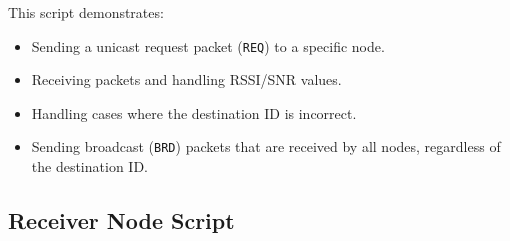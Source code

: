 This script demonstrates:
\begin{itemize}
    \item Sending a unicast request packet (\texttt{REQ}) to a specific node.
    \item Receiving packets and handling RSSI/SNR values.
    \item Handling cases where the destination ID is incorrect.
    \item Sending broadcast (\texttt{BRD}) packets that are received by all nodes, regardless of the destination ID.
\end{itemize}

\subsection{Receiver Node Script}

